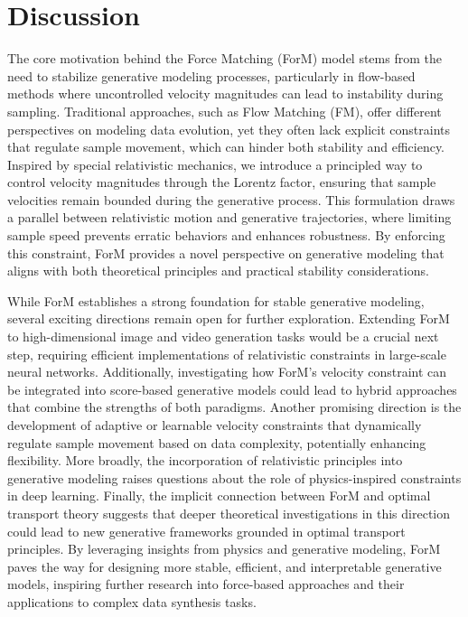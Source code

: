 \section{Discussion}


The core motivation behind the Force Matching (ForM) model stems from the need to stabilize generative modeling processes, particularly in flow-based methods where uncontrolled velocity magnitudes can lead to instability during sampling. Traditional approaches, such as Flow Matching (FM), offer different perspectives on modeling data evolution, yet they often lack explicit constraints that regulate sample movement, which can hinder both stability and efficiency. Inspired by special relativistic mechanics, we introduce a principled way to control velocity magnitudes through the Lorentz factor, ensuring that sample velocities remain bounded during the generative process. This formulation draws a parallel between relativistic motion and generative trajectories, where limiting sample speed prevents erratic behaviors and enhances robustness. By enforcing this constraint, ForM provides a novel perspective on generative modeling that aligns with both theoretical principles and practical stability considerations. 

While ForM establishes a strong foundation for stable generative modeling, several exciting directions remain open for further exploration. Extending ForM to high-dimensional image and video generation tasks would be a crucial next step, requiring efficient implementations of relativistic constraints in large-scale neural networks. Additionally, investigating how ForM’s velocity constraint can be integrated into score-based generative models could lead to hybrid approaches that combine the strengths of both paradigms. Another promising direction is the development of adaptive or learnable velocity constraints that dynamically regulate sample movement based on data complexity, potentially enhancing flexibility. More broadly, the incorporation of relativistic principles into generative modeling raises questions about the role of physics-inspired constraints in deep learning.
Finally, the implicit connection between ForM and optimal transport theory suggests that deeper theoretical investigations in this direction could lead to new generative frameworks grounded in optimal transport principles. 
By leveraging insights from physics and generative modeling, ForM paves the way for designing more stable, efficient, and interpretable generative models, inspiring further research into force-based approaches and their applications to complex data synthesis tasks.


